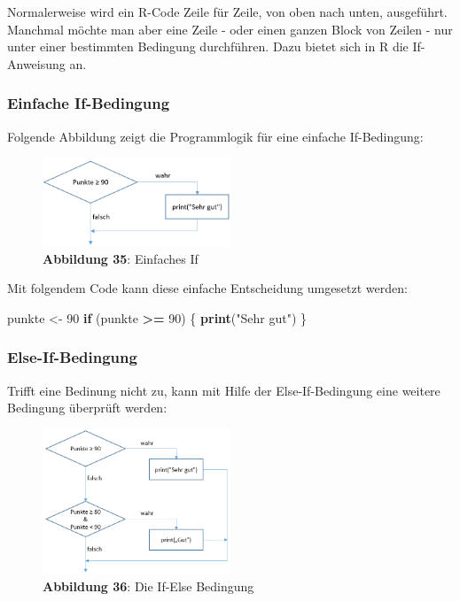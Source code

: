 \documentclass[]{article}
\newenvironment{Shaded}{\begin{snugshade}}{\end{snugshade}}
\newcommand{\KeywordTok}[1]{\textcolor[rgb]{0.13,0.29,0.53}{\textbf{#1}}}
\newcommand{\DecValTok}[1]{\textcolor[rgb]{0.00,0.00,0.81}{#1}}
\newcommand{\StringTok}[1]{\textcolor[rgb]{0.31,0.60,0.02}{#1}}
\newcommand{\ControlFlowTok}[1]{\textcolor[rgb]{0.13,0.29,0.53}{\textbf{#1}}}
\newcommand{\OperatorTok}[1]{\textcolor[rgb]{0.81,0.36,0.00}{\textbf{#1}}}
\newcommand{\NormalTok}[1]{#1}
\begin{document}
Normalerweise wird ein R-Code Zeile für Zeile, von oben nach unten,
ausgeführt. Manchmal möchte man aber eine Zeile - oder einen ganzen
Block von Zeilen - nur unter einer bestimmten Bedingung durchführen.
Dazu bietet sich in R die If-Anweisung an.

\subsubsection*{Einfache If-Bedingung}\label{einfache-if-bedingung}

Folgende Abbildung zeigt die Programmlogik für eine einfache
If-Bedingung:

\begin{figure}
\centering
\includegraphics[width=0.50000\textwidth]{Images/10_R_Simple_If.PNG}
\caption{\textbf{Abbildung 35}: Einfaches If}
\end{figure}

Mit folgendem Code kann diese einfache Entscheidung umgesetzt werden:

\begin{Shaded}
\begin{Highlighting}[]
\NormalTok{  punkte <-}\StringTok{ }\DecValTok{90}
  \ControlFlowTok{if}\NormalTok{ (punkte }\OperatorTok{>=}\StringTok{ }\DecValTok{90}\NormalTok{) \{}
    \KeywordTok{print}\NormalTok{(}\StringTok{"Sehr gut"}\NormalTok{)}
\NormalTok{    \}}
\end{Highlighting}
\end{Shaded}

\subsubsection*{Else-If-Bedingung}\label{else-if-bedingung}

Trifft eine Bedinung nicht zu, kann mit Hilfe der Else-If-Bedingung eine
weitere Bedingung überprüft werden:

\begin{figure}
\centering
\includegraphics[width=0.50000\textwidth]{Images/10_R_Simple_If_Else.PNG}
\caption{\textbf{Abbildung 36}: Die If-Else Bedingung}
\end{figure}
\end{document}
